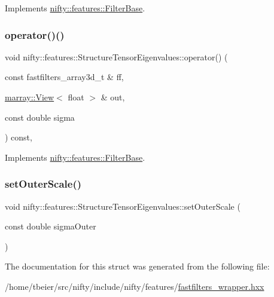 Implements \hyperlink{structnifty_1_1features_1_1FilterBase_a17c77d36dd765c5ec0b163102428656c}{nifty\+::features\+::\+Filter\+Base}.

\mbox{\label{structnifty_1_1features_1_1StructureTensorEigenvalues_a18437b6743a641b081b6053115305bad}} 
\subsubsection{\texorpdfstring{operator()()}{operator()()}\hspace{0.1cm}{\footnotesize\ttfamily [2/2]}}
{\footnotesize\ttfamily void nifty\+::features\+::\+Structure\+Tensor\+Eigenvalues\+::operator() (\begin{DoxyParamCaption}\item[{const fastfilters\+\_\+array3d\+\_\+t \&}]{ff,  }\item[{\hyperlink{classandres_1_1View}{marray\+::\+View}$<$ float $>$ \&}]{out,  }\item[{const double}]{sigma }\end{DoxyParamCaption}) const\hspace{0.3cm}{\ttfamily [inline]}, {\ttfamily [virtual]}}



Implements \hyperlink{structnifty_1_1features_1_1FilterBase_abbef4e9c260026926e0021aa0cc11c81}{nifty\+::features\+::\+Filter\+Base}.

\mbox{\label{structnifty_1_1features_1_1StructureTensorEigenvalues_a55717fa81aee4a1faa8538be206a572f}} 
\subsubsection{\texorpdfstring{set\+Outer\+Scale()}{setOuterScale()}}
{\footnotesize\ttfamily void nifty\+::features\+::\+Structure\+Tensor\+Eigenvalues\+::set\+Outer\+Scale (\begin{DoxyParamCaption}\item[{const double}]{sigma\+Outer }\end{DoxyParamCaption})\hspace{0.3cm}{\ttfamily [inline]}}



The documentation for this struct was generated from the following file\+:\begin{DoxyCompactItemize}
\item 
/home/tbeier/src/nifty/include/nifty/features/\hyperlink{fastfilters__wrapper_8hxx}{fastfilters\+\_\+wrapper.\+hxx}\end{DoxyCompactItemize}
